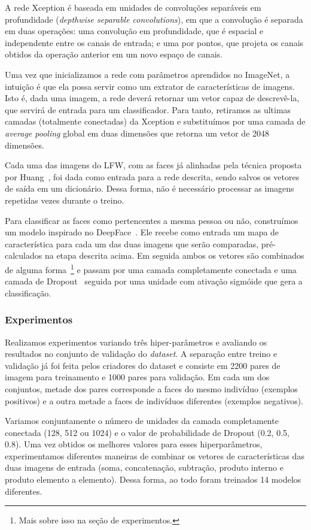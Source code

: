 \documentclass{bmvc2k}
\begin{document}
A rede Xception é baseada em unidades de convoluções separáveis em profundidade (\textit{depthwise separable convolutions}), em que a convolução é separada em duas operações: uma convolução em profundidade, que é espacial e independente entre os canais de entrada; e uma por pontos, que projeta os canais obtidos da operação anterior em um novo espaço de canais.

Uma vez que inicializamos a rede com parâmetros aprendidos no ImageNet, a intuição é que ela possa servir como um extrator de características de imagens. Isto é, dada uma imagem, a rede deverá retornar um vetor capaz de descrevê-la, que servirá de entrada para um classificador. Para tanto, retiramos as ultimas camadas (totalmente conectadas) da Xception e substituímos por uma camada de \textit{average pooling} global em duas dimensões que retorna um vetor de 2048 dimensões.

Cada uma das imagens do LFW, com as faces já alinhadas pela técnica proposta por Huang~\cite{deepfunneling}, foi dada como entrada para a rede descrita, sendo salvos os vetores de saída em um dicionário. Dessa forma, não é necessário processar as imagens repetidas vezes durante o treino.

Para classificar as faces como pertencentes a mesma pessoa ou não, construímos um modelo inspirado no DeepFace~\cite{siamese}. Ele recebe como entrada um mapa de característica para cada um das duas imagens que serão comparadas, pré-calculados na etapa descrita acima. Em seguida ambos os vetores são combinados de alguma forma~\footnote{Mais sobre isso na seção de experimentos.} e passam por uma camada completamente conectada e uma camada de Dropout~\cite{dropout} seguida por uma unidade com ativação sigmóide que gera a classificação.


\subsubsection{Experimentos}
Realizamos experimentos variando três hiper-parâmetros e avaliando os resultados no conjunto de validação do \textit{dataset}. A separação entre treino e validação já foi feita pelos criadores do dataset e consiste em 2200 pares de imagem para treinamento e 1000 pares para validação. Em cada um dos conjuntos, metade dos pares corresponde a faces do mesmo indivíduo (exemplos positivos) e a outra metade a faces de indivíduos diferentes (exemplos negativos).

Variamos conjuntamente o número de unidades da camada completamente conectada (128, 512 ou 1024) e o valor de probabilidade de Dropout (0.2, 0.5, 0.8). Uma vez obtidos os melhores valores para esses hiperparâmetros, experimentamos diferentes maneiras de combinar os vetores de características das duas imagens de entrada (soma, concatenação, subtração, produto interno e produto elemento a elemento). Dessa forma, ao todo foram treinados 14 modelos diferentes.
\end{document}
